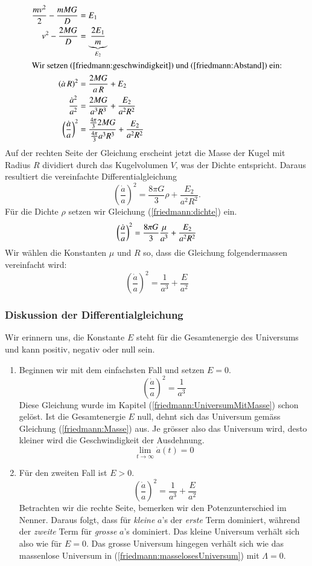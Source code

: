 \begin{refsection}
\begin{align*}
	\frac{m v^2}{2} - \frac{m M G}{D} &= E_1 \\ 
	v^2 - \frac{2 M G}{D} &= \underbrace{\frac{2E_1}{m}}_{E_2}\\	
	\intertext{Wir setzen (\ref{friedmann:geschwindigkeit}) und (\ref{friedmann:Abstand}) ein:}
	\left( \dot{a} \, R\right)^2 &= \frac{2 M G}{a\,R} + E_2 \\
	\frac{\dot{a}^2}{a^2} &= \frac{2 M G}{a^3 R^3} + \frac{E_2}{a^2 R^2} \\
	\left(\frac{\dot{a}}{a} \right)^2 &= \frac{\frac{4 \pi}{3}2 M G}{\frac{4 \pi}{3} a^3 R^3} + \frac{E_2}{a^2 R^2}
\end{align*}
Auf der rechten Seite der Gleichung erscheint jetzt die Masse der Kugel mit Radius $R$ dividiert durch das Kugelvolumen $V$, was der Dichte entspricht. Daraus resultiert die vereinfachte Differentialgleichung 
\begin{equation}
\left(\frac{\dot{a}}{a} \right)^2 = \frac{8 \pi G}{3} \rho + \frac{E_2}{a^2 R^2}.
\label{friedmann:EnergieerhaltungUniversum}
\end{equation}
Für die Dichte $\rho$ setzen wir Gleichung (\ref{friedmann:dichte}) ein.
\[\left(\frac{\dot{a}}{a} \right)^2 = \frac{8 \pi G}{3} \frac{\mu}{a^3} + \frac{E_2}{a^2 R^2} \\\]
Wir wählen die Konstanten $\mu$ und $R$ so, dass die Gleichung folgendermassen vereinfacht wird:
\begin{equation}
\left(\frac{\dot{a}}{a} \right)^2 = \frac{1}{a^3} + \frac{E}{a^2}
\end{equation}

\subsubsection{Diskussion der Differentialgleichung}
Wir erinnern uns, die Konstante $E$ steht für die Gesamtenergie des Universums und kann positiv, negativ oder null sein.
\begin{enumerate}
	\item Beginnen wir mit dem einfachsten Fall und setzen $E = 0$.
	\[\left(\frac{\dot{a}}{a} \right)^2 = \frac{1}{a^3}\]
	Diese Gleichung wurde im Kapitel (\ref{friedmann:UniversumMitMasse}) schon gelöst. Ist die Gesamtenergie $E$ null, dehnt sich das Universum gemäss Gleichung (\ref{friedmann:Masse}) aus. Je grösser also das Universum wird, desto kleiner wird die Geschwindigkeit der Ausdehnung.
	\[\lim_{t\to\infty} \dot{a}(t) = 0\]
	\item Für den zweiten Fall ist $E > 0$.
	\[\ \left(\frac{\dot{a}}{a} \right)^2 = \frac{1}{a^3} + \frac{E}{a^2}\]
	Betrachten wir die rechte Seite, bemerken wir den Potenzunterschied im Nenner. Daraus folgt, dass für {\em kleine} $a$'s der {\em erste} Term dominiert, während der {\em zweite} Term für {\em grosse} $a$'s dominiert. Das kleine Universum verhält sich also wie für $E = 0$. Das grosse Universum hingegen verhält sich wie das massenlose Universum in (\ref{friedmann:masselosesUniversum}) mit $\Lambda = 0$.  
	

\end{enumerate}
\end{refsection}
